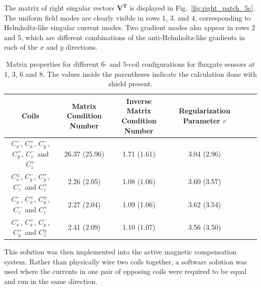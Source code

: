 
The matrix of right singular vectors $\bm{V^T}$ is displayed in
Fig.~\ref{fig:right_patch_5c}.  The uniform field modes are clearly
visible in rows 1, 3, and 4, corresponding to Helmholtz-like singular
current modes.  Two gradient modes also appear in rows 2 and 5, which
are different combinations of the anti-Helmholtz-like gradients in
each of the $x$ and $y$ directions.


\begin{table} [htb!]
    \centering
    \begin{tabular} { |c|c|c|c|c|c|} 
        \hline
        Coils & \makecell{Matrix \\Condition Number} &\makecell{Inverse Matrix \\ Condition Number} & \makecell{Regularization \\Parameter $r$}\\
        \hline\hline
        \makecell{$C_x^-$, $C_x^+$, $C_y^-$,\\ $C_y^+$, $C_z^-$ and $C_z^+$ } & 26.37 (25.96) & 1.71 (1.61) & 3.04 (2.96) \\ 
        \hline
        \makecell{$C_x^{\pm}$, $C_y^-$, $C_y^+$,\\ $C_z^-$ and $C_z^+$ } & 2.26 (2.05) & 1.08 (1.06) & 3.60 (3.57) \\         
        \hline
        \makecell{$C_x^-$, $C_x^+$, $C_y^\pm$,\\ $C_z^-$ and $C_z^+$ } & 2.27 (2.04) & 1.09 (1.06) & 3.62 (3.54) \\
        \hline
        \makecell{$C_x^-$, $C_x^+$, $C_y^-$,\\ $C_y^+$ and $C_z^\pm$ } & 2.41 (2.09) & 1.10 (1.07) & 3.56 (3.50) \\
        \hline

    \end{tabular}
    \caption[Properties for different coil configurations]{Matrix properties for different 6- and 5-coil configurations for fluxgate sensors at 1, 3, 6 and 8. The values inside the parentheses indicate the calculation done with shield present.}\label{table:mcond_coil}
\end{table}


This solution was then implemented into the active magnetic compensation
system.  Rather than physically wire two coils together, a software solution was used where the currents in one pair of opposing coils
were required to be equal and run in the same direction.

